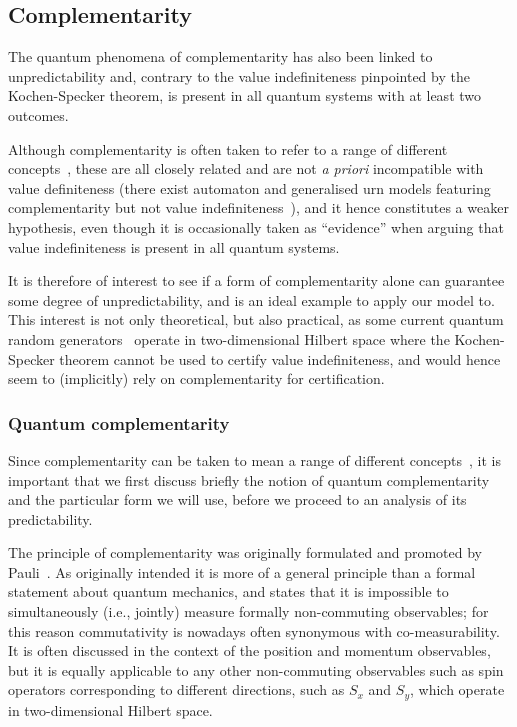 \documentclass[information,article,submit,moreauthors,pdftex,12pt,a4paper]{mdpi}
\theoremstyle{mdpi}
\newcounter{ex}
\newcounter{re}
\theoremstyle{mdpidefinition}
\begin{document}
\subsection{Complementarity}


The quantum phenomena of complementarity has also been linked to unpredictability and, contrary to the value indefiniteness pinpointed by the Kochen-Specker theorem, is present in all quantum systems with at least two outcomes.

Although complementarity is often taken to refer to a range of different concepts~\cite{Fritz:2012fj}, these are all closely related and are
not \emph{a priori} incompatible with value definiteness (there exist automaton and generalised urn models featuring complementarity but not value indefiniteness~\cite{wright,svozil-2001-eua}), and it hence constitutes a weaker hypothesis, even though it is occasionally taken as ``evidence'' when arguing that value indefiniteness is present in all quantum systems.

It is therefore of interest to see if a form of complementarity alone can guarantee some degree of unpredictability, and is an ideal example to apply our model to.
This interest is not only theoretical, but also practical, as some current quantum random generators~\cite{stefanov-2000} operate in two-dimensional Hilbert space where the Kochen-Specker theorem cannot be used to certify value indefiniteness, and would hence seem to (implicitly) rely on complementarity for certification.

\subsubsection{Quantum complementarity}

Since complementarity can be taken to mean a range of different concepts~\cite{Fritz:2012fj}, it is important that we first discuss briefly the notion of quantum complementarity and the particular form we will use, before we proceed to an analysis of its predictability.

The principle of complementarity was originally formulated and promoted by Pauli~\cite{pauli:58}.
As originally intended it is more of a general principle than a formal statement about quantum mechanics, and states that it is impossible to simultaneously (i.e., jointly) measure formally non-commuting observables; for this reason commutativity is nowadays often synonymous with co-measurability.
It is often discussed in the context of the position and momentum observables, but it is equally applicable to any other non-commuting observables such as spin operators corresponding to different directions, such as $S_x$ and $S_y$, which operate in two-dimensional Hilbert space.
\end{document}
